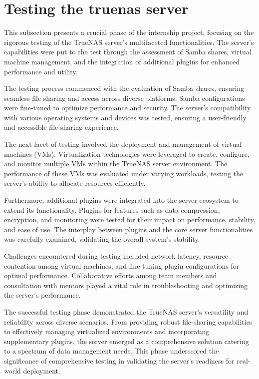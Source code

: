 \section{Testing the truenas server}
This subsection presents a crucial phase of the internship project, focusing on the rigorous testing of the TrueNAS server's multifaceted functionalities. The server's capabilities were put to the test through the assessment of Samba shares, virtual machine management, and the integration of additional plugins for enhanced performance and utility.

The testing process commenced with the evaluation of Samba shares, ensuring seamless file sharing and access across diverse platforms. Samba configurations were fine-tuned to optimize performance and security. The server's compatibility with various operating systems and devices was tested, ensuring a user-friendly and accessible file-sharing experience.

The next facet of testing involved the deployment and management of virtual machines (VMs). Virtualization technologies were leveraged to create, configure, and monitor multiple VMs within the TrueNAS server environment. The performance of these VMs was evaluated under varying workloads, testing the server's ability to allocate resources efficiently.

Furthermore, additional plugins were integrated into the server ecosystem to extend its functionality. Plugins for features such as data compression, encryption, and monitoring were tested for their impact on performance, stability, and ease of use. The interplay between plugins and the core server functionalities was carefully examined, validating the overall system's stability.

Challenges encountered during testing included network latency, resource contention among virtual machines, and fine-tuning plugin configurations for optimal performance. Collaborative efforts among team members and consultation with mentors played a vital role in troubleshooting and optimizing the server's performance.

The successful testing phase demonstrated the TrueNAS server's versatility and reliability across diverse scenarios. From providing robust file-sharing capabilities to effectively managing virtualized environments and incorporating supplementary plugins, the server emerged as a comprehensive solution catering to a spectrum of data management needs. This phase underscored the significance of comprehensive testing in validating the server's readiness for real-world deployment.
